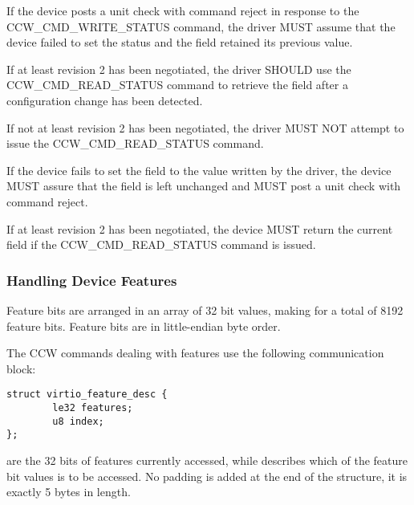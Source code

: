 If the device posts a unit check with command reject in response to the
CCW_CMD_WRITE_STATUS command, the driver MUST assume that the device failed
to set the status and the  field retained
its previous value.

If at least revision 2 has been negotiated, the driver SHOULD use the
CCW_CMD_READ_STATUS command to retrieve the  field after
a configuration change has been detected.

If not at least revision 2 has been negotiated, the driver MUST NOT attempt
to issue the CCW_CMD_READ_STATUS command.


If the device fails to set the  field
to the value written by the driver, the device MUST assure
that the  field is left unchanged and
MUST post a unit check with command reject.

If at least revision 2 has been negotiated, the device MUST return the
current  field if the CCW_CMD_READ_STATUS
command is issued.

\subsubsection{Handling Device Features}\label{sec:Virtio Transport Options / Virtio over channel I/O / Device Initialization / Handling Device Features}

Feature bits are arranged in an array of 32 bit values, making
for a total of 8192 feature bits. Feature bits are in
little-endian byte order.

The CCW commands dealing with features use the following
communication block:

\begin{lstlisting}
struct virtio_feature_desc {
        le32 features;
        u8 index;
};
\end{lstlisting}

 are the 32 bits of features currently accessed, while
 describes which of the feature bit values is to be
accessed. No padding is added at the end of the structure, it is
exactly 5 bytes in length.


